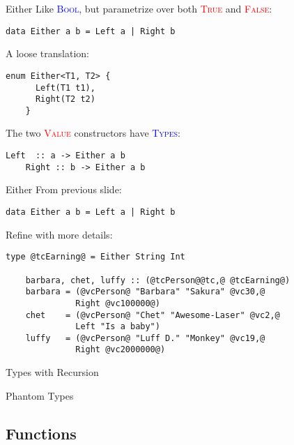 \documentclass[xcolor={usenames,dvipsnames}]{beamer}
\newcommand{\htycon}[1]{\textcolor{Blue}{\textsc{#1}}}
\newcommand{\hvalcon}[1]{\textcolor{Red}{\textsc{#1}}}
\begin{document}
\begin{frame}[fragile]{Either}
  Like \htycon{Bool}, but parametrize over both \hvalcon{True} and \hvalcon{False}:
  \begin{lstlisting}[style=hask]
    data Either a b = Left a | Right b
  \end{lstlisting}

  \pause
  A loose translation:
  \begin{lstlisting}[style=hask]
    enum Either<T1, T2> {
      Left(T1 t1),
      Right(T2 t2)
    }
  \end{lstlisting}

  \pause
  The two \hvalcon{Value} constructors have \htycon{Types}:
  \begin{lstlisting}[style=hask]
    Left  :: a -> Either a b
    Right :: b -> Either a b
  \end{lstlisting}
\end{frame}

\begin{frame}[fragile]{Either}
  From previous slide:
  \begin{lstlisting}[style=hask]
    data Either a b = Left a | Right b
  \end{lstlisting}

  \pause
  Refine with more details:
  \begin{lstlisting}[style=hask]
    type @tcEarning@ = Either String Int

    barbara, chet, luffy :: (@tcPerson@@tc,@ @tcEarning@)
    barbara = (@vcPerson@ "Barbara" "Sakura" @vc30,@
              Right @vc100000@)
    chet    = (@vcPerson@ "Chet" "Awesome-Laser" @vc2,@
              Left "Is a baby") 
    luffy   = (@vcPerson@ "Luff D." "Monkey" @vc19,@
              Right @vc2000000@)
  \end{lstlisting}
\end{frame}

\begin{frame}[fragile]{Types with Recursion}
\end{frame}

\begin{frame}[fragile]{Phantom Types}
\end{frame}


\subsection{Functions}
\end{document}
